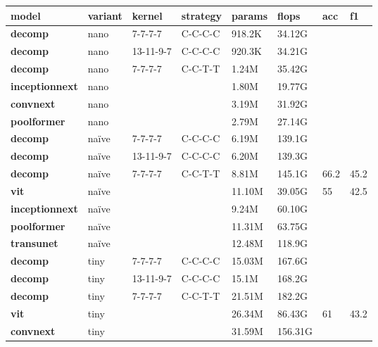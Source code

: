 \begin{table*}[t]
\scriptsize
\renewcommand\arraystretch{1.4}
\begin{center}
\begin{tabular}{|l|l|l|l|l|l|l|l|}
    \hline
        \textbf{model} & \textbf{variant} & \textbf{kernel} & \textbf{strategy} & \textbf{params} & \textbf{flops} & \textbf{acc} & \textbf{f1} \\ \hline
        \textbf{decomp} & nano & 7-7-7-7 & C-C-C-C & 918.2K & 34.12G & ~ & ~ \\ \hline
        \textbf{decomp} & nano & 13-11-9-7 & C-C-C-C & 920.3K & 34.21G & ~ & ~ \\ \hline
        \textbf{decomp} & nano & 7-7-7-7 & C-C-T-T & 1.24M & 35.42G & ~ & ~ \\ \hline
        \textbf{inceptionnext} & nano & ~ & ~ & 1.80M & 19.77G & ~ & ~ \\ \hline
        \textbf{convnext} & nano & ~ & ~ & 3.19M & 31.92G & ~ & ~ \\ \hline
        \textbf{poolformer} & nano & ~ & ~ & 2.79M & 27.14G & ~ & ~ \\ \hline
        \textbf{decomp} & naïve & 7-7-7-7 & C-C-C-C & 6.19M & 139.1G & ~ & ~ \\ \hline
        \textbf{decomp} & naïve & 13-11-9-7 & C-C-C-C & 6.20M & 139.3G & ~ & ~ \\ \hline
        \textbf{decomp} & naïve & 7-7-7-7 & C-C-T-T & 8.81M & 145.1G & 66.2 & 45.2 \\ \hline
        \textbf{vit} & naïve & ~ & ~ & 11.10M & 39.05G & 55 & 42.5 \\ \hline
        \textbf{inceptionnext} & naïve & ~ & ~ & 9.24M & 60.10G & ~ & ~ \\ \hline        
        \textbf{poolformer} & naïve & ~ & ~ & 11.31M & 63.75G & ~ & ~ \\ \hline
        \textbf{transunet} & naïve & ~ & ~ & 12.48M & 118.9G & ~ & ~ \\ \hline
        \textbf{decomp} & tiny & 7-7-7-7 & C-C-C-C & 15.03M & 167.6G & ~ & ~ \\ \hline
        \textbf{decomp} & tiny & 13-11-9-7 & C-C-C-C & 15.1M & 168.2G & ~ & ~ \\ \hline
        \textbf{decomp} & tiny & 7-7-7-7 & C-C-T-T & 21.51M & 182.2G & ~ & ~ \\ \hline
        \textbf{vit} & tiny & ~ & ~ & 26.34M & 86.43G & 61 & 43.2 \\ \hline
        \textbf{convnext} & tiny & ~ & ~ & 31.59M & 156.31G & ~ & ~ \\ \hline

\end{tabular}
\end{center}
\end{table*}
